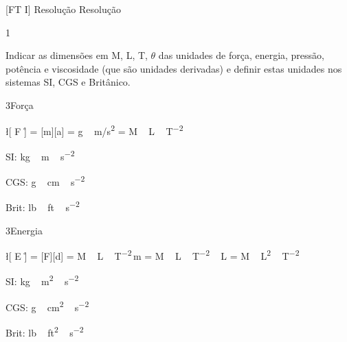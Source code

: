 \documentclass[\mainfilename]{subfiles}
\begin{document}
[FT I]
{Resolução}
{Resolução}

\begin{questionBox}1{} %
    
    Indicar as dimensões em M, L, T, \(\theta\) das unidades de força, energia, pressão, potência e viscosidade (que são unidades derivadas) e definir estas unidades nos sistemas SI, CGS e Britânico.

    \begin{questionBox}3{Força} %
        
        \begin{BM}
            \l[ F \r]
            = [m][a]
            = \unit{\gram\,\metre/\second^2}
            = \unit{M\,L\,T^{-2}}
        \end{BM}

        \begin{itemize}
            \begin{multicols}{3}
                \item[SI:]   \unit{\kilo\gram\,\metre\,\second^{-2}}
                \item[CGS:]  \unit{\gram\,\centi\metre\,\second^{-2}}
                \item[Brit:] \unit{lb\,ft\,\second^{-2}}
            \end{multicols}
        \end{itemize}
        
    \end{questionBox}

    \begin{questionBox}3{Energia} %
        
        \begin{BM}
            \l[ E \r]
            = [F][d]
            = \unit{M\,L\,T^{-2}}\,\unit{\metre}
            = \unit{M\,L\,T^{-2}\,L}
            = \unit{M\,L^2\,T^{-2}}
        \end{BM}

        \begin{itemize}
            \begin{multicols}{3}
                \item[SI:]   \unit{\kilo\gram\,\metre^2\,\second^{-2}}
                \item[CGS:]  \unit{\gram\,\centi\metre^2\,\second^{-2}}
                \item[Brit:] \unit{lb\,ft^2\,\second^{-2}}
            \end{multicols}
        \end{itemize}
        

\end{questionBox}
\end{questionBox}
\end{document}
